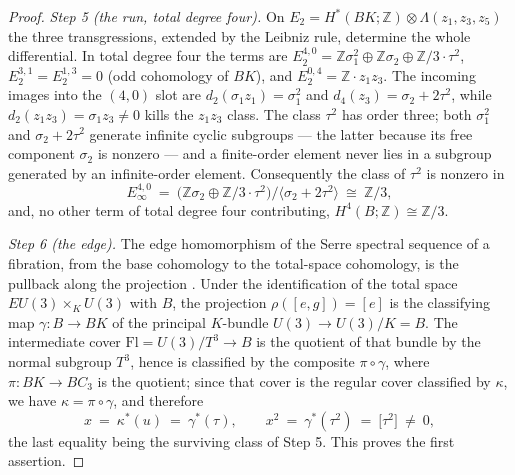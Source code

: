 \documentclass[11pt,a4paper]{article}
\begin{document}
\begin{proof}
\emph{Step 5 (the run, total degree four).} On
$E_2=H^*(BK;\mathbb Z)\otimes\Lambda(z_1,z_3,z_5)$ the three
transgressions, extended by the Leibniz rule, determine the whole
differential. In total degree four the terms are
$E_2^{4,0}=\mathbb Z\sigma_1^2\oplus\mathbb Z\sigma_2\oplus\mathbb
Z/3\cdot\tau^2$, $E_2^{3,1}=E_2^{1,3}=0$ (odd cohomology of $BK$), and
$E_2^{0,4}=\mathbb Z\cdot z_1z_3$. The incoming images into the $(4,0)$
slot are $d_2(\sigma_1z_1)=\sigma_1^2$ and $d_4(z_3)=\sigma_2+2\tau^2$,
while $d_2(z_1z_3)=\sigma_1z_3\ne0$ kills the $z_1z_3$ class. The class
$\tau^2$ has order three; both $\sigma_1^2$ and $\sigma_2+2\tau^2$ generate
infinite cyclic subgroups --- the latter because its free component
$\sigma_2$ is nonzero --- and a finite-order element never lies in a
subgroup generated by an infinite-order element. Consequently the class of
$\tau^2$ is nonzero in
\[
E_\infty^{4,0}\ =\ \bigl(\mathbb Z\sigma_2\oplus\mathbb Z/3\cdot\tau^2\bigr)
\big/\langle\sigma_2+2\tau^2\rangle\ \cong\ \mathbb Z/3,
\]
and, no other term of total degree four contributing,
$H^4(B;\mathbb Z)\cong\mathbb Z/3$.

\emph{Step 6 (the edge).} The edge homomorphism of the Serre spectral
sequence of a fibration, from the base cohomology to the total-space
cohomology, is the pullback along the projection
\cite{Brown1982,HatcherSS}. Under the identification of the total space
$EU(3)\times_KU(3)$ with $B$, the projection $\rho([e,g])=[e]$ is the
classifying map $\gamma\colon B\to BK$ of the principal $K$-bundle
$U(3)\to U(3)/K=B$. The intermediate cover $\mathrm{Fl}=U(3)/T^3\to B$ is
the quotient of that bundle by the normal subgroup $T^3$, hence is
classified by the composite $\pi\circ\gamma$, where $\pi\colon BK\to BC_3$
is the quotient; since that cover is the regular cover classified by
$\kappa$, we have $\kappa=\pi\circ\gamma$, and therefore
\[
x\ =\ \kappa^*(u)\ =\ \gamma^*(\tau),
\qquad
x^2\ =\ \gamma^*(\tau^2)\ =\ \bigl[\tau^2\bigr]\ \ne\ 0,
\]
the last equality being the surviving class of Step 5. This proves the first
assertion.


\end{proof}
\end{document}
